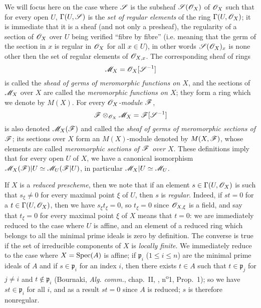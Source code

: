 \begin{env}[20.1.3]
\label{IV.20.1.3}
We will focus here on the case where $\mathscr{S}$ is the subsheaf $\mathscr{S}(\mathscr{O}_X)$ of $\mathscr{O}_X$ such that for every open $U$, $\Gamma(U,\mathscr{S})$ is the \emph{set of regular elements} of the ring $\Gamma(U,\mathscr{O}_X)$;
it is immediate that it is a sheaf (and not only a presheaf), the regularity of a section of $\mathscr{O}_X$ over $U$ being verified ``fibre by fibre'' (i.e. meaning that the germ of the section in $x$ is regular in $\mathscr{O}_X$ for all $x\in U$), in other words $\mathscr{S}(\mathscr{O}_X)_x$ is none other then the set of regular elements of $\mathscr{O}_{X,x}$.
The corresponding sheaf of rings
\[
  \mathscr{M}_X=\mathscr{O}_X[\mathscr{S}^{-1}]
\]
is called the \emph{shead of germs of meromorphic functions on $X$}, and the sections of $\mathscr{M}_X$ over $X$ are called the \emph{meromorphic functions on $X$};
they form a ring which we denote by $M(X)$.
For every \emph{$\mathscr{O}_X$-module $\mathscr{F}$},
\[
  \mathscr{F}\otimes_{\mathscr{O}_X}\mathscr{M}_X=\mathscr{F}[\mathscr{S}^{-1}]
\]
is also denoted $\mathscr{M}_X(\mathscr{F})$ and called the \emph{sheaf of germs of meromorphic sections of $\mathscr{F}$};
its sections over $X$ form an $M(X)$-module denoted by $M(X,\mathscr{F})$, whose elements are called \emph{meromorphic sections of $\mathscr{F}$ over $X$}.
These definitions imply that for every open $U$ of $X$, we have a canonical isomorphism $\mathscr{M}_X(\mathscr{F})|U\simeq\mathscr{M}_U(\mathscr{F}|U)$, in particular $\mathscr{M}_X|U\simeq\mathscr{M}_U$.
\end{env}

\begin{env}[20.1.3.1]
\label{IV.20.1.3.1}
If $X$ is a \emph{reduced prescheme}, then we note that if an element $s\in\Gamma(U,\mathscr{O}_X)$ is such that $s_\xi\neq 0$ for every maximal point $\xi$ of $U$, then $s$ is \emph{regular}.
Indeed, if $st=0$ for a $t\in\Gamma(U,\mathscr{O}_X)$, then we have $s_\xi t_\xi=0$, so $t_\xi=0$ since $\mathscr{O}_{X,\xi}$ is a field, and say that $t_\xi=0$ for every maximal point $\xi$ of $X$ means that $t=0$: we are immediately reduced to the case where $U$ is affine, and an element of a reduced ring which belongs to all the minimal prime ideals is zero by definition.
The converse is true if the set of irreducible components of $X$ is \emph{locally finite}.
We immediately reduce to the case where $X=\operatorname{Spec}(A)$ is affine;
if $\mathfrak{p}_i$ ($1\leq i\leq n$) are the minimal prime ideals of $A$ and if $s\in\mathfrak{p}_i$ for an index $i$, then there exists $t\in A$ such that $t\in\mathfrak{p}_j$ for $j\neq i$ and $t\not\in\mathfrak{p}_i$ (Bournaki, \emph{Alg. comm.}, chap.~II, , n\textsuperscript{o}1, Prop.~1);
so we have $st\in\mathfrak{p}_i$ for all $i$, and as a result $st=0$ since $A$ is reduced;
$s$ is therefore nonregular.
\end{env}


